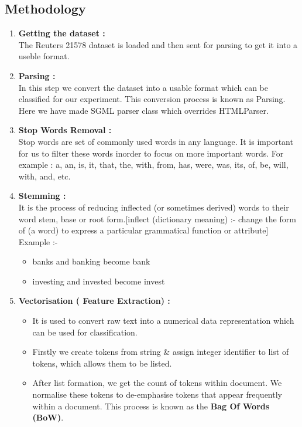 \documentclass{report}
\begin{document}
\begin{multicols}{2}
\section{\Huge Methodology}
\begin{enumerate}[label=\Roman*.]
\item \textbf{Getting the dataset :}\\
The Reuters 21578 dataset is loaded and then sent for parsing to get it into a useble format.
\item \textbf{Parsing :}\\ In this step we convert the dataset into a usable format which can be classified for our experiment. This conversion process is known as Parsing. Here we have made SGML parser class which overrides HTMLParser.
\item \textbf{Stop Words Removal :}\\ Stop words are set of commonly used words in any language. It is important for us to filter these words inorder to focus on more important words. For example : a, an, is, it, that, the, with, from, has, were,  was, its, of, be, will, with, and, etc.
\item \textbf{Stemming :}\\  It is the process of reducing inflected (or sometimes derived) words to their word stem, base or root form.[inflect (dictionary meaning) :- change the form of (a word) to express a particular grammatical function or attribute]\\
\linebreak
Example :-
 \begin{itemize}
 	\item banks and banking become bank
 	\item investing and invested become invest
 \end{itemize}
 \item \textbf{Vectorisation ( Feature Extraction) :}
 \begin{itemize}
 \item It is used to convert raw text into a numerical data representation which can be used for classification.
 \item Firstly we create tokens from string \& assign integer identifier to list of tokens, which allows them to be listed.
 \item After list formation, we get the count of tokens within document. We normalise these tokens to de-emphasise tokens that appear frequently within a document. This process is known as the \textbf{Bag Of Words (BoW)}.

\end{itemize}
\end{enumerate}
\end{multicols}
\end{document}
